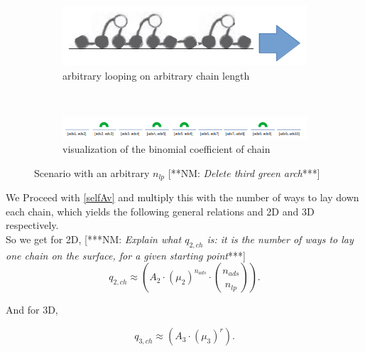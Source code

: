 \documentclass[10pt,letterpaper]{article}
\begin{document}
\begin{figure}[h!]
	\centering
	\begin{subfigure}[b]{0.2\textwidth}
		\centering
		\includegraphics[scale=0.2]{multiloops.png}
		\caption{arbitrary looping on arbitrary chain length}
		\label{loop and train}
	\end{subfigure}~~
	\begin{subfigure}[b]{0.6\textwidth}
		\centering
		\includegraphics[scale=0.6]{looping.png}
		\caption{visualization of the binomial coefficient of chain}
		\label{loop and train}		
	\end{subfigure}
\caption{Scenario with an arbitrary $n_{lp}$
[**NM: \textit{Delete third green arch}***]}
\end{figure}



\noindent We Proceed with \ref{selfAv} and multiply this with the number of ways to lay down each chain, which yields the following general relations and 2D and 3D respectively.\\ 

\noindent So we get for 2D,
[***NM:  \textit{Explain what $q_{2,ch}$ is:  it is
the number of ways to lay one chain on the
surface, for a given starting point}***]
\begin{equation}
	q_{2,ch}\approx \left(A_2\cdot (\mu_{2})^{n_{ads}} \cdot \binom{n_{ads}}{n_{lp}} \right). 
	\label{eq. q2}
\end{equation}

\noindent And for 3D, 

\begin{equation}
	q_{3,ch}\approx \left(A_3\cdot (\mu_{3})^{r}\right).
	\label{eq. q3}
\end{equation}



%
\end{document}
